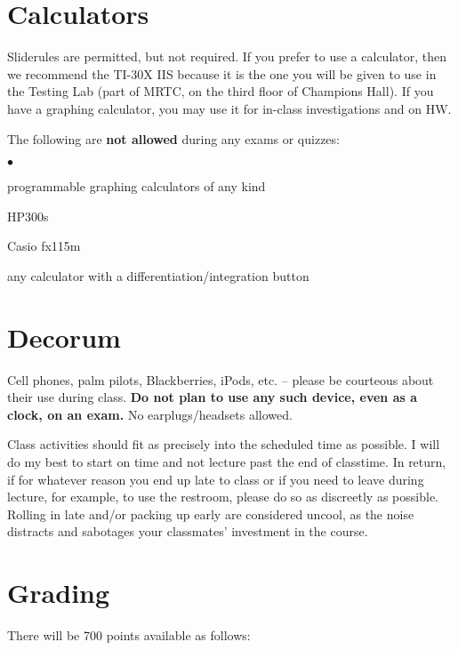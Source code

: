 \documentclass[margin,line,pifont,palatino,courier]{res}
\newenvironment{list2}{
  \begin{list}{$\bullet$}{%
      \setlength{\itemsep}{0in}
      \setlength{\parsep}{0in} \setlength{\parskip}{0in}
      \setlength{\topsep}{0in} \setlength{\partopsep}{0in}
      \setlength{\leftmargin}{0.2in}}}{\end{list}}
\begin{document}
\begin{resume}
\section{\sc Calculators} Sliderules are permitted, but not required.  If you prefer to use a calculator, then we recommend the TI-30X IIS because it is the one you will be given to use in the Testing Lab (part of MRTC, on the third floor of Champions Hall).  If you have a graphing calculator, you may use it for in-class investigations and on HW.

The following are {\bf not allowed} during any exams or quizzes:
\begin{list2} 
\item programmable graphing calculators of any kind
\item HP300s 
\item Casio fx115m 
\item any calculator with a differentiation/integration button 
\end{list2}  

\section{\sc Decorum} Cell phones, palm pilots, Blackberries, iPods, etc. -- please be courteous about their use during class.  {\bf Do not plan to use any such device, even as a clock, on an exam.} No earplugs/headsets allowed.

Class activities should fit as precisely into the scheduled time as possible.   I will do my best to start on time and not lecture past the end of classtime.  In return, if for whatever reason you end up late to class or if you need to leave during lecture, for example, to use the restroom, please do so as discreetly as possible.  Rolling in late and/or packing up early are considered uncool, as the noise distracts and sabotages your classmates' investment in the course. 

\section{\sc Grading} There will be 700 points available as follows:


\end{resume}
\end{document}
